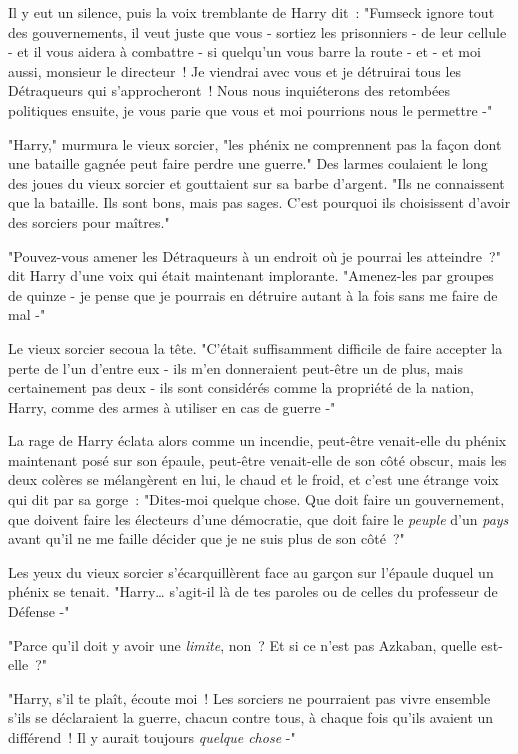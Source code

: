 Il y eut un silence, puis la voix tremblante de Harry dit~: "Fumseck ignore tout des gouvernements, il veut juste que vous - sortiez les prisonniers - de leur cellule - et il vous aidera à combattre - si quelqu'un vous barre la route - et - et moi aussi, monsieur le directeur~! Je viendrai avec vous et je détruirai tous les Détraqueurs qui s'approcheront~! Nous nous inquiéterons des retombées politiques ensuite, je vous parie que vous et moi pourrions nous le permettre -"

"Harry," murmura le vieux sorcier, "les phénix ne comprennent pas la façon dont une bataille gagnée peut faire perdre une guerre." Des larmes coulaient le long des joues du vieux sorcier et gouttaient sur sa barbe d'argent. "Ils ne connaissent que la bataille. Ils sont bons, mais pas sages. C'est pourquoi ils choisissent d'avoir des sorciers pour maîtres."

"Pouvez-vous amener les Détraqueurs à un endroit où je pourrai les atteindre~?" dit Harry d'une voix qui était maintenant implorante. "Amenez-les par groupes de quinze - je pense que je pourrais en détruire autant à la fois sans me faire de mal -"

Le vieux sorcier secoua la tête. "C'était suffisamment difficile de faire accepter la perte de l'un d'entre eux - ils m'en donneraient peut-être un de plus, mais certainement pas deux - ils sont considérés comme la propriété de la nation, Harry, comme des armes à utiliser en cas de guerre -"

La rage de Harry éclata alors comme un incendie, peut-être venait-elle du phénix maintenant posé sur son épaule, peut-être venait-elle de son côté obscur, mais les deux colères se mélangèrent en lui, le chaud et le froid, et c'est une étrange voix qui dit par sa gorge~: "Dites-moi quelque chose. Que doit faire un gouvernement, que doivent faire les électeurs d'une démocratie, que doit faire le \emph{peuple} d'un \emph{pays} avant qu'il ne me faille décider que je ne suis plus de son côté~?"

Les yeux du vieux sorcier s'écarquillèrent face au garçon sur l'épaule duquel un phénix se tenait. "Harry… s'agit-il là de tes paroles ou de celles du professeur de Défense -"

"Parce qu'il doit y avoir une \emph{limite}, non~? Et si ce n'est pas Azkaban, quelle est-elle~?"

"Harry, s'il te plaît, écoute moi~! Les sorciers ne pourraient pas vivre ensemble s'ils se déclaraient la guerre, chacun contre tous, à chaque fois qu'ils avaient un différend~! Il y aurait toujours \emph{quelque chose} -"

